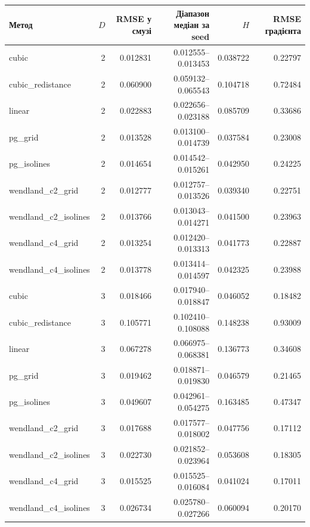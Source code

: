 \begin{tabular}{lrrrrr}\toprule
Метод & $D$ & RMSE у смузі & Діапазон медіан за seed & $H$ & RMSE градієнта \\ \midrule
cubic & 2 & 0.012831 & 0.012555--0.013453 & 0.038722 & 0.22797 \\
cubic\_redistance & 2 & 0.060900 & 0.059132--0.065543 & 0.104718 & 0.72484 \\
linear & 2 & 0.022883 & 0.022656--0.023188 & 0.085709 & 0.33686 \\
pg\_grid & 2 & 0.013528 & 0.013100--0.014739 & 0.037584 & 0.23008 \\
pg\_isolines & 2 & 0.014654 & 0.014542--0.015261 & 0.042950 & 0.24225 \\
wendland\_c2\_grid & 2 & 0.012777 & 0.012757--0.013526 & 0.039340 & 0.22751 \\
wendland\_c2\_isolines & 2 & 0.013766 & 0.013043--0.014271 & 0.041500 & 0.23963 \\
wendland\_c4\_grid & 2 & 0.013254 & 0.012420--0.013313 & 0.041773 & 0.22887 \\
wendland\_c4\_isolines & 2 & 0.013778 & 0.013414--0.014597 & 0.042325 & 0.23988 \\
cubic & 3 & 0.018466 & 0.017940--0.018847 & 0.046052 & 0.18482 \\
cubic\_redistance & 3 & 0.105771 & 0.102410--0.108088 & 0.148238 & 0.93009 \\
linear & 3 & 0.067278 & 0.066975--0.068381 & 0.136773 & 0.34608 \\
pg\_grid & 3 & 0.019462 & 0.018871--0.019830 & 0.046579 & 0.21465 \\
pg\_isolines & 3 & 0.049607 & 0.042961--0.054275 & 0.163485 & 0.47347 \\
wendland\_c2\_grid & 3 & 0.017688 & 0.017577--0.018002 & 0.047756 & 0.17112 \\
wendland\_c2\_isolines & 3 & 0.022730 & 0.021852--0.023964 & 0.053608 & 0.18305 \\
wendland\_c4\_grid & 3 & 0.015525 & 0.015525--0.016084 & 0.041024 & 0.17011 \\
wendland\_c4\_isolines & 3 & 0.026734 & 0.025780--0.027266 & 0.060094 & 0.20170 \\
\bottomrule\end{tabular}
